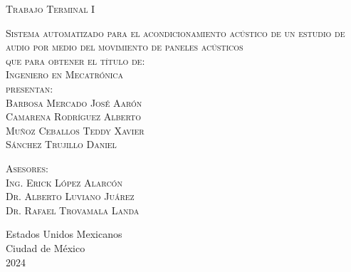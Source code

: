 \begin{titlepage}
\begin{minipage}[c][0.81\textheight][t]{0.75\textwidth}
\begin{center}
        
      {
        {\large\scshape Trabajo Terminal I }
      }\\[0.4cm]

      \vspace{0.8cm}            

      \textsc{\LARGE Sistema automatizado para el acondicionamiento acústico de un estudio de audio por medio del movimiento de paneles acústicos }\\[1cm]
      \textsc{\large que para obtener el t\'itulo de:}\\[0.3cm]
      \textsc{\large Ingeniero en Mecatrónica}\\[0.6cm]
      
      {\textsc{\large presentan:}}\\[0.3cm]
      \textsc{\large {Barbosa Mercado José Aarón}}\\
      \textsc{\large {Camarena Rodríguez Alberto }}\\
      \textsc{\large {Muñoz Ceballos Teddy Xavier}}\\
      \textsc{\large {Sánchez Trujillo Daniel}}\\[0.3cm]  

      \vspace{0.5cm}

      {\large\scshape 
        {Asesores:}\\[0.3cm] {Ing. Erick López Alarcón\\ 
         Dr. Alberto Luviano Juárez \\ Dr. Rafael Trovamala Landa}}\\[.2in]

      \vspace{0.5cm}

      \large{Estados Unidos Mexicanos\\ 
        Ciudad de México\\
        2024}
    \end{center}
  \end{minipage}
\end{titlepage}
